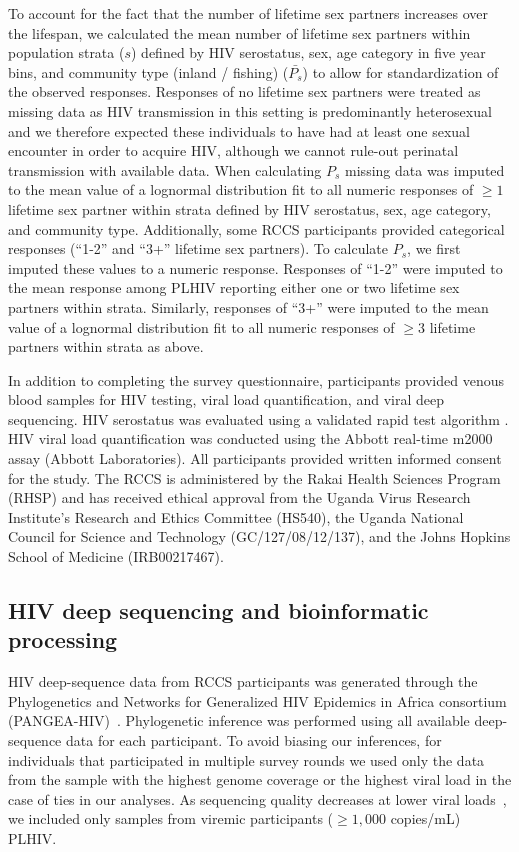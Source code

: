 \documentclass[10pt,letterpaper]{article}
\begin{document}
To account for the fact that the number of lifetime sex partners increases over the lifespan, we calculated the mean number of lifetime sex partners within population strata ($s$) defined by HIV serostatus, sex, age category in five year bins, and community type (inland / fishing) ($\bar{P_s}$) to allow for standardization of the observed responses. Responses of no lifetime sex partners were treated as missing data as HIV transmission in this setting is predominantly heterosexual \cite{ugandaAIDS2012} and we therefore expected these individuals to have had at least one sexual encounter in order to acquire HIV, although we cannot rule-out perinatal transmission with available data. When calculating $P_s$ missing data was imputed to the mean value of a lognormal distribution fit to all numeric responses of $\ge1$ lifetime sex partner within strata defined by HIV serostatus, sex, age category, and community type. Additionally, some RCCS participants provided categorical responses (``1-2'' and ``3+'' lifetime sex partners). To calculate $P_s$, we first imputed these values to a numeric response. Responses of ``1-2'' were imputed to the mean response among PLHIV reporting either one or two lifetime sex partners within strata. Similarly, responses of ``3+'' were imputed to the mean value of a lognormal distribution fit to all numeric responses of $\ge3$ lifetime partners within strata as above. 

In addition to completing the survey questionnaire, participants provided venous blood samples for HIV testing, viral load quantification, and viral deep sequencing. HIV serostatus was evaluated using a validated rapid test algorithm \cite{kagulire2011}. HIV viral load quantification was conducted using the Abbott real-time m2000 assay (Abbott Laboratories). All participants provided written informed consent for the study. The RCCS is administered by the Rakai Health Sciences Program (RHSP) and has received ethical approval from the Uganda Virus Research Institute’s Research and Ethics Committee (HS540), the Uganda National Council for Science and Technology (GC/127/08/12/137), and the Johns Hopkins School of Medicine (IRB00217467).  

\subsection{HIV deep sequencing and bioinformatic processing}
HIV deep-sequence data from RCCS participants was generated through the Phylogenetics and Networks for Generalized HIV Epidemics in Africa consortium (PANGEA-HIV)~\cite{pillay2015,abeler-dorner2019}. Phylogenetic inference was performed using all available deep-sequence data for each participant. To avoid biasing our inferences, for individuals that participated in multiple survey rounds we used only the data from the sample with the highest genome coverage or the highest viral load in the case of ties in our analyses. As sequencing quality decreases at lower viral loads~\cite{bonsall2020}, we included only samples from viremic participants ($\ge1,000$ copies/mL) PLHIV. \par
\end{document}
